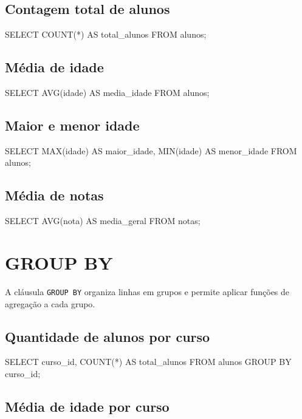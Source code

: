 \subsection{Contagem total de alunos}

\begin{sqlcode}
SELECT COUNT(*) AS total_alunos
FROM alunos;
\end{sqlcode}

\subsection{Média de idade}

\begin{sqlcode}
SELECT AVG(idade) AS media_idade
FROM alunos;
\end{sqlcode}

\subsection{Maior e menor idade}

\begin{sqlcode}
SELECT MAX(idade) AS maior_idade,
       MIN(idade) AS menor_idade
FROM alunos;
\end{sqlcode}

\subsection{Média de notas}

\begin{sqlcode}
SELECT AVG(nota) AS media_geral
FROM notas;
\end{sqlcode}

\section{GROUP BY}

A cláusula \texttt{GROUP BY} organiza linhas em grupos e permite aplicar funções de agregação a cada grupo.

\subsection{Quantidade de alunos por curso}

\begin{sqlcode}
SELECT
    curso_id,
    COUNT(*) AS total_alunos
FROM alunos
GROUP BY curso_id;
\end{sqlcode}

\subsection{Média de idade por curso}

